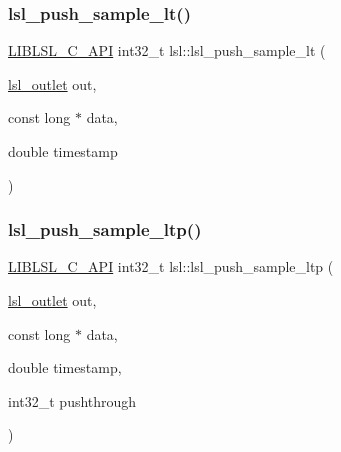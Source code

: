 \mbox{\label{namespacelsl_ad257a8fe8aee5d302292dd40d93fe335}} 
\subsubsection{\texorpdfstring{lsl\+\_\+push\+\_\+sample\+\_\+lt()}{lsl\_push\_sample\_lt()}}
{\footnotesize\ttfamily \hyperlink{lsl__cpp_8h_aafd0ef1813e8be84a1420c4f1df64615}{L\+I\+B\+L\+S\+L\+\_\+\+C\+\_\+\+A\+PI} int32\+\_\+t lsl\+::lsl\+\_\+push\+\_\+sample\+\_\+lt (\begin{DoxyParamCaption}\item[{\hyperlink{namespacelsl_abcf512b0f66dacf86c10b165995fd50b}{lsl\+\_\+outlet}}]{out,  }\item[{const long $\ast$}]{data,  }\item[{double}]{timestamp }\end{DoxyParamCaption})}

\mbox{\label{namespacelsl_a4839e55343dd8c3aea6c8e2a65d706ed}} 
\subsubsection{\texorpdfstring{lsl\+\_\+push\+\_\+sample\+\_\+ltp()}{lsl\_push\_sample\_ltp()}}
{\footnotesize\ttfamily \hyperlink{lsl__cpp_8h_aafd0ef1813e8be84a1420c4f1df64615}{L\+I\+B\+L\+S\+L\+\_\+\+C\+\_\+\+A\+PI} int32\+\_\+t lsl\+::lsl\+\_\+push\+\_\+sample\+\_\+ltp (\begin{DoxyParamCaption}\item[{\hyperlink{namespacelsl_abcf512b0f66dacf86c10b165995fd50b}{lsl\+\_\+outlet}}]{out,  }\item[{const long $\ast$}]{data,  }\item[{double}]{timestamp,  }\item[{int32\+\_\+t}]{pushthrough }\end{DoxyParamCaption})}

\mbox{\label{namespacelsl_a8d80592d7fd643d64533ef83f6808743}} 
